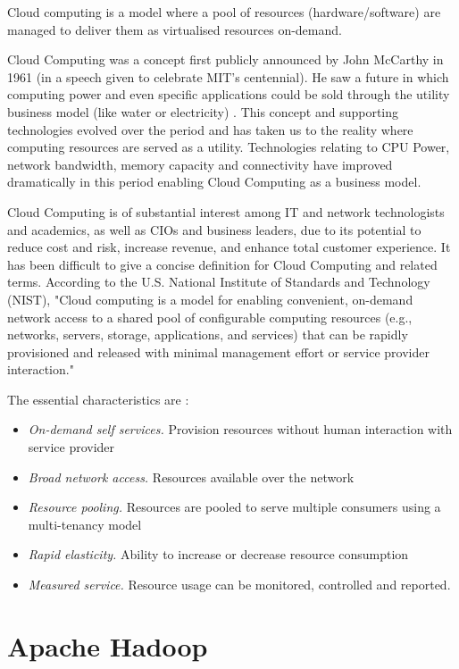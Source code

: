 \documentclass[12pt,a4paper]{report}
\begin{document}
Cloud computing is a model where a pool of resources (hardware/software) are
managed to deliver them as virtualised resources on-demand.


Cloud Computing was a concept first publicly announced by John McCarthy in 1961 
(in a speech given to celebrate MIT's centennial). He saw a future in which computing 
power and even specific applications could be sold through the utility 
business model (like water or electricity) \cite{garfinkel1999architects} .
This concept and  supporting technologies evolved over the period and has taken us 
to the reality where computing resources are served as a utility. 
Technologies relating to CPU Power, network bandwidth, memory capacity 
and connectivity have improved dramatically in this period enabling Cloud Computing as 
a business model.

Cloud Computing is of substantial interest among IT and network technologists
and academics, as well as CIOs and business leaders, due to its potential to 
reduce cost and risk, increase revenue, and enhance total customer experience.\cite{weinman2011future}
It has been difficult to give a concise definition for Cloud Computing 
and related terms. According to the U.S. National Institute of Standards 
and Technology (NIST), \cite{mell2009nist}  "Cloud computing is a model for enabling convenient,
on-demand network access to a shared pool of configurable computing resources
(e.g., networks, servers, storage, applications, and services) that can 
be rapidly provisioned and released with minimal management 
effort or service provider interaction." 

The essential characteristics are \cite{mell2009nist} :

\begin{itemize}
  \item \emph{On-demand self services.} Provision resources without human
     interaction with service provider
  \item \emph{Broad network access.} Resources available over the network
  \item \emph{Resource pooling.} Resources are pooled to serve multiple 
        consumers using a multi-tenancy model
  \item \emph{Rapid elasticity.} Ability to increase or decrease resource consumption
  \item \emph{Measured service.} Resource usage can be monitored, controlled and reported.
\end{itemize}

\section{Apache Hadoop}
\end{document}
